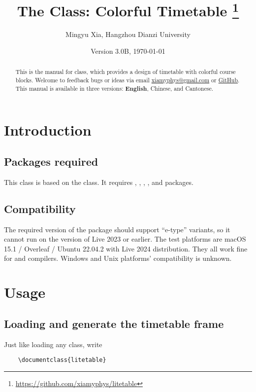 \documentclass[letterpaper]{l3doc}
\title{
    The \cls{litetable} Class: Colorful Timetable
    \thanks{\url{https://github.com/xiamyphys/litetable}}
}
\author{Mingyu Xia, Hangzhou Dianzi University}
\affil{\href{mailto:xiamyphys@gmail.com}{xiamyphys@gmail.com}}
\date{Version 3.0B, \today}
\begin{document}
\maketitle

\begin{abstract}
    This is the manual for  class, which provides a design of timetable with colorful course blocks. Welcome to feedback bugs or ideas via email \href{mailto:xiamyphys@gmail.com}{xiamyphys@gmail.com} or \href{https://github.com/xiamyphys/litetable/issues}{GitHub}. This manual is available in three versions: \textbf{English}, Chinese, and Cantonese.
\end{abstract}

\section{Introduction}

\subsection{Packages required}

This class is based on the  class. It requires , , , , and  packages. 

\subsection{Compatibility}

The required version of the  package should support ``e-type'' variants, so it cannot run on the version of Live 2023 or earlier. The test platforms are macOS 15.1 / Overleaf / Ubuntu 22.04.2 with Live 2024 distribution. They all work fine for  and  compilers. Windows and Unix platforms' compatibility is unknown.

\section{Usage}

\subsection{Loading  and generate the timetable frame}

Just like loading any class, write

\begin{Verbatim}
    \documentclass{litetable}
\end{Verbatim}
\end{document}
